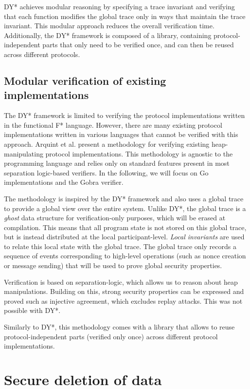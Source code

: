 \documentclass{article}
\begin{document}
DY* achieves modular reasoning by specifying a trace invariant and verifying that each function modifies the global trace only in ways that maintain the trace invariant. This modular approach reduces the overall verification time.
Additionally, the DY* framework is composed of a library, containing protocol-independent parts that only need to be verified once, and can then be reused across different protocols. 

\subsection{Modular verification of existing implementations}

The DY* framework is limited to verifying the protocol implementations written in the functional F* language. However, there are many existing protocol implementations written in various languages that cannot be verified with this approach.
Arquint et al.\cite{arquint2022generic} present a methodology for verifying existing heap-manipulating protocol implementations. This methodology is agnostic to the programming language and relies only on standard features present in most separation logic-based verifiers. In the following, we will focus on Go implementations and the Gobra\cite{wolf2021gobra} verifier.

The methodology is inspired by the DY* framework and also uses a global trace to provide a global view over the entire system.
Unlike DY*, the global trace is a \textit{ghost} data structure for verification-only purposes, which will be erased at compilation. This means that all program state is not stored on this global trace, but is instead distributed at the local participant-level. \textit{Local invariants} are used to relate this local state with the global trace.
The global trace only records a sequence of events corresponding to high-level operations (such as nonce creation or message sending) that will be used to prove global security properties.

Verification is based on separation-logic, which allows us to reason about heap manipulations. Building on this, strong security properties can be expressed and proved such as injective agreement, which excludes replay attacks. This was not possible with DY*.

Similarly to DY*, this methodology comes with a library that allows to reuse protocol-independent parts (verified only once) across different protocol implementations.

\section{Secure deletion of data}
\end{document}
